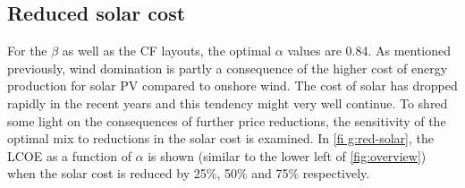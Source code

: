 \documentclass[a4paper, 5p, sort&compress]{elsarticle}%
\begin{document}
%

\subsection{Reduced solar cost}
\label{sec:reduced-solar-cost}

For the $\beta$ as well as the CF layouts, the optimal $\alpha$ values are
0.84. As mentioned previously, wind domination is partly a consequence
of the higher cost of energy production for solar PV compared to
onshore wind. The cost of solar has dropped rapidly in the recent
years and this tendency might very well continue. To shred some light
on the consequences of further price reductions, the sensitivity of
the optimal mix to reductions in the solar cost is examined. In
\cref{fi g:red-solar}, the LCOE as a function of $\alpha$ is shown (similar
to the lower left of \cref{fig:overview}) when the solar cost is
reduced by 25\%, 50\% and 75\% respectively.
\end{document}
